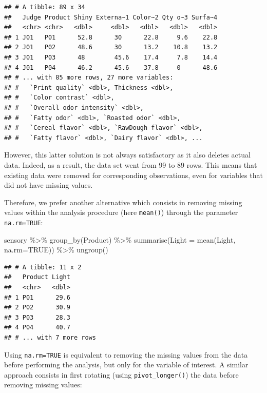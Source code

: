 \documentclass[
]{krantz}
\makeatletter
\newenvironment{Shaded}{\begin{snugshade}}{\end{snugshade}}
\newcommand{\AttributeTok}[1]{\textcolor[rgb]{0.61,0.61,0.61}{#1}}
\newcommand{\ConstantTok}[1]{\textcolor[rgb]{0,0,0}{#1}}
\newcommand{\FunctionTok}[1]{\textcolor[rgb]{0,0,0}{#1}}
\newcommand{\NormalTok}[1]{#1}
\newcommand{\SpecialCharTok}[1]{\textcolor[rgb]{0,0,0}{#1}}
\newenvironment{kframe}{%
\medskip{}
\setlength{\fboxsep}{.8em}
 \def\at@end@of@kframe{}%
 \ifinner\ifhmode%
  \def\at@end@of@kframe{\end{minipage}}%
  \begin{minipage}{\columnwidth}%
 \fi\fi%
 \def\FrameCommand##1{\hskip\@totalleftmargin \hskip-\fboxsep
 \colorbox{shadecolor}{##1}\hskip-\fboxsep
     \hskip-\linewidth \hskip-\@totalleftmargin \hskip\columnwidth}%
 \MakeFramed {\advance\hsize-\width
   \@totalleftmargin\z@ \linewidth\hsize
   \@setminipage}}%
 {\par\unskip\endMakeFramed%
 \at@end@of@kframe}
\renewenvironment{Shaded}{\begin{kframe}}{\end{kframe}}
\makeatother
\begin{document}
\begin{verbatim}
## # A tibble: 89 x 34
##   Judge Product Shiny Externa~1 Color~2 Qty o~3 Surfa~4
##   <chr> <chr>   <dbl>     <dbl>   <dbl>   <dbl>   <dbl>
## 1 J01   P01      52.8      30      22.8     9.6    22.8
## 2 J01   P02      48.6      30      13.2    10.8    13.2
## 3 J01   P03      48        45.6    17.4     7.8    14.4
## 4 J01   P04      46.2      45.6    37.8     0      48.6
## # ... with 85 more rows, 27 more variables:
## #   `Print quality` <dbl>, Thickness <dbl>,
## #   `Color contrast` <dbl>,
## #   `Overall odor intensity` <dbl>,
## #   `Fatty odor` <dbl>, `Roasted odor` <dbl>,
## #   `Cereal flavor` <dbl>, `RawDough flavor` <dbl>,
## #   `Fatty flavor` <dbl>, `Dairy flavor` <dbl>, ...
\end{verbatim}

However, this latter solution is not always satisfactory as it also deletes actual data. Indeed, as a result, the data set went from 99 to 89 rows. This means that existing data were removed for corresponding observations, even for variables that did not have missing values.

Therefore, we prefer another alternative which consists in removing missing values within the analysis procedure (here \texttt{mean()}) through the parameter \texttt{na.rm=TRUE}:

\begin{Shaded}
\begin{Highlighting}[]
\NormalTok{sensory }\SpecialCharTok{\%\textgreater{}\%} 
  \FunctionTok{group\_by}\NormalTok{(Product) }\SpecialCharTok{\%\textgreater{}\%} 
  \FunctionTok{summarise}\NormalTok{(}\AttributeTok{Light =} \FunctionTok{mean}\NormalTok{(Light, }\AttributeTok{na.rm=}\ConstantTok{TRUE}\NormalTok{)) }\SpecialCharTok{\%\textgreater{}\%} 
  \FunctionTok{ungroup}\NormalTok{()}
\end{Highlighting}
\end{Shaded}

\begin{verbatim}
## # A tibble: 11 x 2
##   Product Light
##   <chr>   <dbl>
## 1 P01      29.6
## 2 P02      30.9
## 3 P03      28.3
## 4 P04      40.7
## # ... with 7 more rows
\end{verbatim}

Using \texttt{na.rm=TRUE} is equivalent to removing the missing values from the data before performing the analysis, but only for the variable of interest. A similar approach consists in first rotating (using \texttt{pivot\_longer()}) the data before removing missing values:
\end{document}
